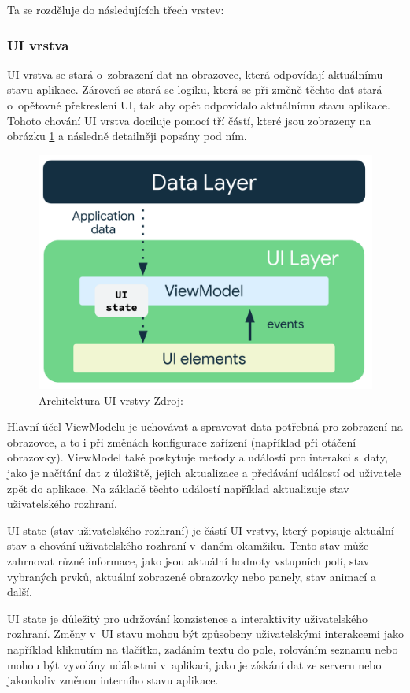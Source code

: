 Ta se rozděluje do následujících třech vrstev:

\subsubsection*{UI vrstva} \label{UILayerNavrh}
UI vrstva se stará o~zobrazení dat na obrazovce, která odpovídají aktuálnímu stavu aplikace. Zároveň se stará se logiku, která
se při změně těchto dat stará o~opětovné překreslení UI, tak aby opět odpovídalo aktuálnímu stavu aplikace. Tohoto chování UI vrstva 
dociluje pomocí tří částí, které jsou zobrazeny na obrázku \ref{fig:arch_ui_udf} a následně detailněji popsány pod ním.

\begin{figure}[H]
  \centering
  \includegraphics[width=.5\textwidth]{arch-ui-udf.png}
  \caption{Architektura UI vrstvy Zdroj: \cite{imgDataFlow}}
  \label{fig:arch_ui_udf}
\end{figure}

Hlavní účel ViewModelu je uchovávat a spravovat data potřebná pro zobrazení na obrazovce, a to i při změnách konfigurace zařízení 
(například při otáčení obrazovky). ViewModel také poskytuje metody a události pro interakci s~daty, jako je načítání dat z úložiště, 
jejich aktualizace a předávání událostí od uživatele zpět do aplikace. Na základě těchto událostí například aktualizuje stav uživatelského
rozhraní. %

 \label{UIStateParagraph}
UI state (stav uživatelského rozhraní) je částí UI vrstvy, který popisuje aktuální stav a chování uživatelského 
rozhraní v~daném okamžiku. Tento stav může zahrnovat různé informace, jako jsou aktuální hodnoty vstupních polí, stav vybraných prvků,
 aktuální zobrazené obrazovky nebo panely, stav animací a další.

UI state je důležitý pro udržování konzistence a interaktivity uživatelského rozhraní. Změny v~UI stavu mohou být způsobeny uživatelskými
interakcemi jako například kliknutím na tlačítko, zadáním textu do pole, rolováním seznamu nebo mohou být vyvolány událostmi v~aplikaci,
jako je získání dat ze serveru nebo jakoukoliv změnou interního stavu aplikace. 

